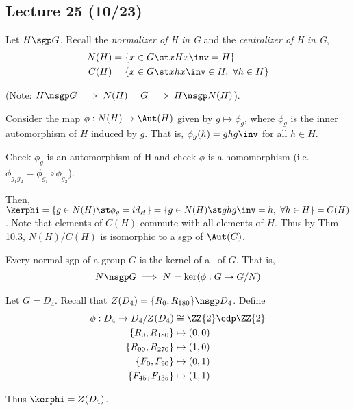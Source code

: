 \subsection*{Lecture 25 (10/23)} %

\begin{example}[N/C Theorem] Let \(H\sgp G\). Recall the \emph{normalizer of H in G} and the \emph{centralizer of H in G}, \begin{align*}
    N(H)&=\{x\in G \st xHx\inv=H\} \\
    C(H)&=\{x\in G \st xhx\inv \in H,\ \forall h\in H\}
\end{align*}

(Note: \(H\nsgp G \implies N(H)=G \implies H\nsgp N(H)\)).

Consider the map \(\phi: N(H)\to \Aut(H)\) given by \(g\mapsto \phi_g\), where \(\phi_g\) is the inner automorphism of \(H\) induced by \(g\). That is, \(\phi_g(h)=ghg\inv \) for all \(h\in H\).\\

\begin{exercise}
    Check \(\phi_g\) is an automorphism of H and check \(\phi\) is a homomorphism (i.e. \(\phi_{g_1g_2}=\phi_{g_1}\circ\phi_{g_2}\)).
\end{exercise}

Then, \(\kerphi = \{g\in N(H) \st \phi_g=id_H\} = \{g\in N(H) \st ghg\inv=h,\ \forall h\in H\}= C(H)\). Note that elements of \(C(H)\) commute with all elements of \(H\). Thus by Thm 10.3, \(N(H)/C(H)\) is isomorphic to a sgp of \(\Aut(G)\).
\end{example}

\begin{theorem}
    Every normal sgp of a group \(G\) is the kernel of a \homo\ of \(G\). That is,
    \begin{align*}
        N\nsgp G \implies N = \ker(\phi:G\to G/N)
    \end{align*}
\end{theorem}

\begin{example}
    Let \(G = D_4\). Recall that \(Z(D_4)=\{R_0, R_{180}\}\nsgp D_4\). Define
    \begin{align*}
        \phi: D_4 \to D_4/Z(D_4)&\cong \ZZ{2} \edp \ZZ{2} \\
        \{R_0, R_{180}\}&\mapsto (0,0) \\
        \{R_{90}, R_{270}\}&\mapsto (1,0) \\
        \{F_0, F_{90}\}&\mapsto (0,1) \\
        \{F_{45}, F_{135}\}&\mapsto (1,1) \\
    \end{align*}

    Thus \(\kerphi = Z(D_4)\).
\end{example}

